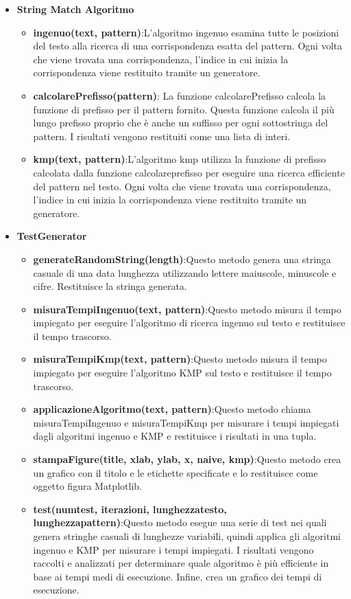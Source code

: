 \begin{itemize}
    \item \textbf{String Match Algoritmo}
    \begin{itemize}
        \item \textbf{ingenuo(text, pattern)}:L'algoritmo ingenuo esamina tutte le posizioni del testo alla ricerca di una corrispondenza esatta del pattern. Ogni volta che viene trovata una corrispondenza, l'indice in cui inizia la corrispondenza viene restituito tramite un generatore.
        \item \textbf{calcolarePrefisso(pattern)}: La funzione calcolarePrefisso calcola la funzione di prefisso per il pattern fornito. Questa funzione calcola il più lungo prefisso proprio che è anche un suffisso per ogni sottostringa del pattern. I risultati vengono restituiti come una lista di interi.
        \item \textbf{kmp(text, pattern)}:L'algoritmo kmp utilizza la funzione di prefisso calcolata dalla funzione calcolareprefisso per eseguire una ricerca efficiente del pattern nel testo. Ogni volta che viene trovata una corrispondenza, l'indice in cui inizia la corrispondenza viene restituito tramite un generatore.
    \end{itemize}
    \item \textbf{TestGenerator}
    \begin{itemize}
        \item \textbf{generateRandomString(length)}:Questo metodo genera una stringa casuale di una data lunghezza utilizzando lettere maiuscole, minuscole e cifre. Restituisce la stringa generata.
        \item \textbf{misuraTempiIngenuo(text, pattern)}:Questo metodo misura il tempo impiegato per eseguire l'algoritmo di ricerca ingenuo sul testo e restituisce il tempo trascorso.
        \item \textbf{misuraTempiKmp(text, pattern)}:Questo metodo misura il tempo impiegato per eseguire l'algoritmo KMP sul testo e restituisce il tempo trascorso.
        \item \textbf{applicazioneAlgoritmo(text, pattern)}:Questo metodo chiama misuraTempiIngenuo e misuraTempiKmp per misurare i tempi impiegati dagli algoritmi ingenuo e KMP e restituisce i risultati in una tupla.
        \item \textbf{stampaFigure(title, xlab, ylab, x, naive, kmp)}:Questo metodo crea un grafico con il titolo e le etichette specificate e lo restituisce come oggetto figura Matplotlib.
        \item \textbf{test(numtest, iterazioni, lunghezzatesto, lunghezzapattern)}:Questo metodo esegue una serie di test nei quali genera stringhe casuali di lunghezze variabili, quindi applica gli algoritmi ingenuo e KMP per misurare i tempi impiegati. I risultati vengono raccolti e analizzati per determinare quale algoritmo è più efficiente in base ai tempi medi di esecuzione. Infine, crea un grafico dei tempi di esecuzione.
    \end{itemize}
\end{itemize}

